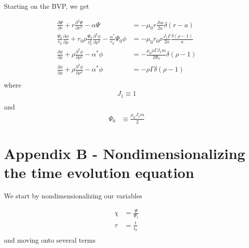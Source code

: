 \documentclass{article}
\begin{document}
Starting on the BVP, we get

\begin{equation} \label{wessonCurrentProfile}
\begin{split}
 \frac{\partial \Psi}{\partial r} +r   \frac{\partial^2 \Psi}{\partial r^2} - \alpha \Psi & = - \mu_0r  \frac{Jm}{2a} \delta (r-a)\\ 
 \frac{\Psi_0}{r_0} \frac{\partial \phi}{\partial \rho} + r_0 \rho \frac{\Psi_0}{r_0^2}   \frac{\partial^2 \phi}{\partial \rho^2} - \frac{\alpha^*}{r_0} \Psi_0 \phi & = - \mu_0 r_0 \rho \frac{J_1 \Gamma}{2a} \frac{\delta (\rho - 1)}{a}\\
\frac{\partial \phi}{\partial \rho} + \rho   \frac{\partial^2 \phi}{\partial \rho^2} - \alpha^* \phi & = - \frac{\mu_0 \rho \Gamma J_1 m}{2 \Psi_0} \delta (\rho - 1)\\
\frac{\partial \phi}{\partial \rho} + \rho   \frac{\partial^2 \phi}{\partial \rho^2} - \alpha^* \phi & = - \rho \Gamma \delta (\rho - 1)\\
\end{split} 
\end{equation} 
where
\begin{equation} \label{wessonCurrentProfile}
\begin{split}
J_1 \equiv 1 \\
\end{split} 
\end{equation} 
and
\begin{equation} \label{wessonCurrentProfile}
\begin{split}
\Psi_0 & \equiv  \frac{\mu_0 J_1 m}{2}
\end{split} 
\end{equation} 


\section*{Appendix B - Nondimensionalizing the time evolution equation}

We start by nondimensionalizing our variables

\begin{equation} \label{wessonCurrentProfile}
\begin{split}
\chi & = \frac{\Psi}{\Psi_1}\\
\tau & = \frac{t}{t_0}\\
\end{split} 
\end{equation} 
and moving onto several terms
\end{document}
